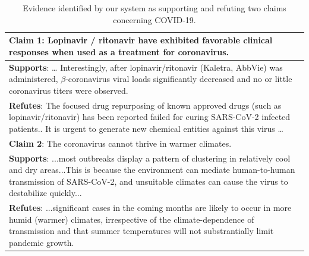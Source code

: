 \newcommand{\supportsCovid}[1]{{\color{c1} {#1}}}

\newcommand{\refutesCovid}[1]{{\color{c2} {#1}}}

\newcommand{\wrongContext}[1]{{\color{c3} \textbf{#1}}}



\begin{table}[t!]
  \setlength{\tabcolsep}{.25em}
  \footnotesize
  \centering

  \begin{tabularx}{\textwidth}{ X }
    \toprule
    \textbf{Claim 1}: Lopinavir / ritonavir have exhibited favorable clinical responses when used as a treatment for coronavirus. \\
    \midrule
    \textbf{Supports}: \dots \supportsCovid{Interestingly, after lopinavir/ritonavir (Kaletra, AbbVie) was administered, $\beta$-coronavirus viral loads significantly decreased and no or little coronavirus titers were observed.} \\
    \midrule
    \textbf{Refutes}: \refutesCovid{The focused drug repurposing of known approved drugs (such as lopinavir/ritonavir) has been reported failed for curing SARS-CoV-2 infected patients.}. It is urgent to generate new chemical entities against this virus \dots \\
    \midrule
    \textbf{Claim 2}: The coronavirus cannot thrive in warmer climates. \\
    \midrule
    \textbf{Supports}: \supportsCovid{...most outbreaks display a pattern of clustering in relatively cool and dry areas...This is because the environment can mediate human-to-human transmission of SARS-CoV-2, and unsuitable climates can cause the virus to destabilize quickly...} \\
    \midrule
    \textbf{Refutes}: \refutesCovid{...significant cases in the coming months are likely to occur in more humid (warmer) climates, irrespective of the climate-dependence of transmission and that summer temperatures will not substrantially limit pandemic growth}. \\
    \bottomrule
  \end{tabularx}

  \caption{Evidence identified by our system as supporting and refuting two claims concerning COVID-19.}
  \label{tbl:covid_example}


\end{table}
